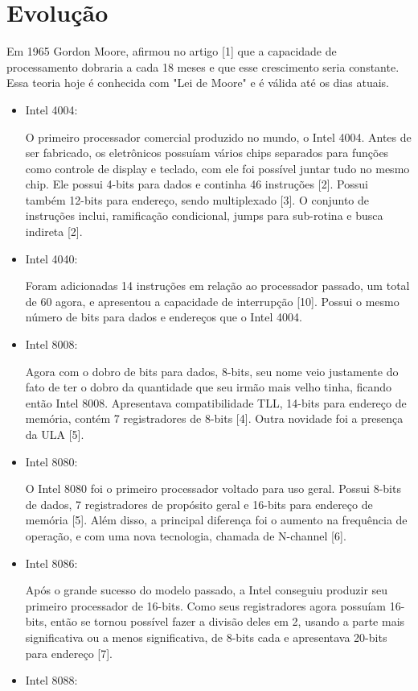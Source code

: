 \documentclass[12pt]{article}
\begin{document}
\section{Evolução} 
	Em 1965 Gordon Moore, afirmou no artigo [1] que a capacidade de processamento dobraria a cada 18 meses e que esse crescimento seria constante. Essa teoria hoje é conhecida com "Lei de Moore" e é válida até os dias atuais.
	\begin{itemize}
		\item Intel 4004: \
	
		O primeiro processador comercial produzido no mundo, o Intel 4004. Antes de ser fabricado, os eletrônicos possuíam vários chips separados para funções como controle de display e teclado, com ele foi possível juntar tudo no mesmo chip. Ele possui 4-bits para dados e continha 46 instruções [2]. Possui também 12-bits para endereço, sendo multiplexado [3]. O conjunto de instruções inclui, ramificação condicional, jumps para sub-rotina e busca indireta [2].
	\item Intel 4040: \
	
		Foram adicionadas 14 instruções em relação ao processador passado, um total de 60 agora, e apresentou a capacidade de interrupção [10]. Possui o mesmo número de bits para dados e endereços que o Intel 4004.
	\item Intel 8008: \
	 
		Agora com o dobro de bits para dados, 8-bits, seu nome veio justamente do fato de ter o dobro da quantidade que seu irmão mais velho tinha, ficando então Intel 8008. Apresentava compatibilidade TLL, 14-bits para endereço de memória, contém 7 registradores de 8-bits [4]. Outra novidade foi a presença da ULA [5].
	\item Intel 8080: \
	
		O Intel 8080 foi o primeiro processador voltado para uso geral. Possui 8-bits de dados, 7 registradores de propósito geral e 16-bits para endereço de memória [5]. Além disso, a principal diferença foi o aumento na frequência de operação, e com uma nova tecnologia, chamada de N-channel [6].
	\item Intel 8086: \
	
		Após o grande sucesso do modelo passado, a Intel conseguiu produzir seu primeiro processador de 16-bits. Como seus registradores agora possuíam 16-bits, então se tornou possível fazer a divisão deles em 2, usando a parte mais significativa ou a menos significativa, de 8-bits cada e apresentava 20-bits para endereço [7].
	\item Intel 8088: \
	

\end{itemize}
\end{document}
